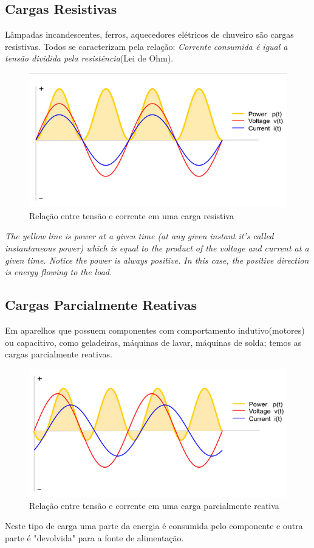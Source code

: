 \documentclass[a4paper, 12pt]{article}
\begin{document}
\subsection{Cargas Resistivas}
Lâmpadas incandescentes, ferros, aquecedores elétricos de chuveiro são cargas resistivas. Todos se caracterizam pela relação: \textit{Corrente consumida é igual a tensão dividida pela resistência}(Lei de Ohm). 
\begin{figure}[h]
	\centering
	\includegraphics[width=0.7\linewidth]{imagens/graf}
	\caption{Relação entre tensão e corrente em uma carga resistiva}
	\label{fig:graf}
\end{figure}
\begin{flushright}
	\textit{The yellow line is power at a given time (at any given instant it's called instantaneous power) which is equal to the product of the voltage and current at a given time. Notice the power is always positive. In this case, the positive direction is energy flowing to the load.}
\end{flushright}

\newpage
\subsection{Cargas Parcialmente Reativas}
Em aparelhos que possuem componentes com comportamento indutivo(motores) ou capacitivo, como geladeiras, máquinas de lavar, máquinas de solda; temos as cargas parcialmente reativas.
\begin{figure}[h]
	\centering
	\includegraphics[width=0.7\linewidth]{imagens/graf1}
	\caption{Relação entre tensão e corrente em uma carga parcialmente reativa}
	\label{fig:graf1}
\end{figure}
Neste tipo de carga uma parte da energia é consumida pelo componente e outra parte é "devolvida" para a fonte de alimentação.
\end{document}
